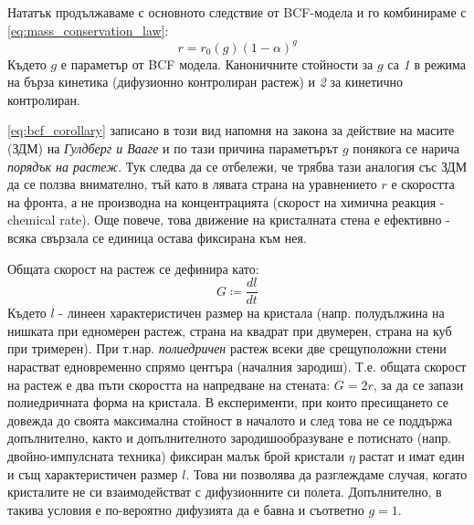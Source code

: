 Нататък продължаваме с основното следствие от BCF-модела \cite{BCF1951} и го комбинираме с \autoref{eq:mass_conservation_law}:
\begin{equation}
	\label{eq:bcf_corollary}
	r = r_0(g)(1-\alpha)^g
\end{equation}
Където $g$ е параметър от BCF модела. Каноничните стойности за $g$ са \textit{1} в режима на бърза кинетика (дифузионно контролиран растеж) и \textit{2} за кинетично контролиран.

\autoref{eq:bcf_corollary} записано в този вид напомня на закона за действие на масите (ЗДМ) на  \textit{Гулдберг и Вааге} и по тази причина параметърът $g$ понякога се нарича \textit{порядък на растеж}. Тук следва да се отбележи, че трябва тази аналогия със ЗДМ да се ползва внимателно, тъй като в лявата страна на уравнението $r$ е скоростта на фронта, а не производна на концентрацията (скорост на химична реакция - chemical rate). Още повече, това движение на кристалната стена е ефективно - всяка свързала се единица остава фиксирана към нея.

\noindent Общата скорост на растеж се дефинира като:
\begin{equation}
	\label{eq:overall_growth_rate}
	G \coloneqq \frac{dl}{dt}
\end{equation}
Където $l$ - линеен характеристичен размер на кристала (напр. полудължина на нишката при едномерен растеж, страна на квадрат при двумерен, страна на куб при тримерен).
При т.нар. \textit{полиедричен} растеж всеки две срещуположни стени нарастват едновременно спрямо центъра (началния зародиш). Т.е. общата скорост на растеж е два пъти скоростта на напредване на стената: $G = 2r$, за да се запази полиедричната форма на кристала.
В експерименти, при които пресищането се довежда до своята максимална стойност в началото и след това не се поддържа допълнително, както и допълнителното зародишообразуване е потиснато (напр. двойно-импулсната техника) фиксиран малък брой кристали $\eta$ растат и имат един и същ характеристичен размер $l$. Това ни позволява да разглеждаме случая, когато кристалите не си взаимодействат с дифузионните си полета. Допълнително, в такива условия е по-вероятно дифузията да е бавна и съответно $g = 1$.


